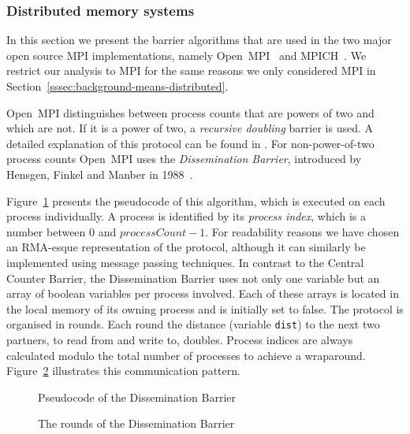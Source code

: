 \documentclass[a4paper, 10pt]{article}
\begin{document}
\subsubsection{Distributed memory systems}
\label{sssec:background-currently-used-distributed}

In this section we present the barrier algorithms that are used in the two major open source MPI implementations, namely Open~MPI~\cite{openmpi} and MPICH~\cite{mpich}. We restrict our analysis to MPI for the same reasons we only considered MPI in Section~\ref{sssec:background-means-distributed}.

Open~MPI distinguishes between process counts that are powers of two and which are not. If it is a power of two, a \emph{recursive doubling} barrier is used. A detailed explanation of this protocol can be found in \cite{hoefler2005}. For non-power-of-two process counts Open~MPI uses the \emph{Dissemination Barrier}, introduced by Hensgen, Finkel and Manber in 1988~\cite{hensgen1988}.

Figure~\ref{fig:pseudocode-dissemination} presents the pseudocode of this algorithm, which is executed on each process individually. A process is identified by its \emph{process index}, which is a number between 0 and $\mathit{processCount} - 1$. For readability reasons we have chosen an RMA-esque representation of the protocol, although it can similarly be implemented using message passing techniques.
In contrast to the Central Counter Barrier, the Dissemination Barrier uses not only one variable but an array of boolean variables per process involved. Each of these arrays is located in the local memory of its owning process and is initially set to false.
The protocol is organised in rounds. Each round the distance (variable \texttt{dist}) to the next two partners, to read from and write to, doubles. Process indices  are always calculated modulo the total number of processes to achieve a wraparound. Figure~\ref{fig:diagram-dissemination} illustrates this communication pattern.

\begin{figure}[htbp]
	\centering
	
	\caption{Pseudocode of the Dissemination Barrier}
	\label{fig:pseudocode-dissemination}
\end{figure}

\begin{figure}[htbp]
	\centering
	
	\caption{The rounds of the Dissemination Barrier}
	\label{fig:diagram-dissemination}
\end{figure}
\end{document}
